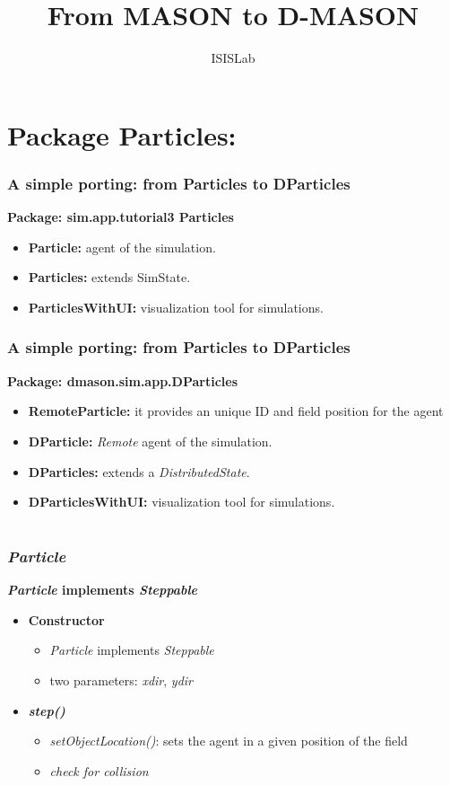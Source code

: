 \documentclass[]{beamer}
\title{From MASON to D-MASON}    %
\author{ISISLab}                 %
\institute{Università degli Studi di Salerno}      %
\date{}                    %
\begin{document}
\begin{frame}
  \titlepage{}
\end{frame}

\section[Package Particles vs D-Particles]{Package Particles:}
\begin{frame}
\frametitle{A simple porting: from Particles to DParticles}
\textbf{Package: sim.app.tutorial3 Particles}
\begin{itemize}
\item \textbf{Particle:} agent of the simulation.
\item \textbf{Particles:} extends SimState.
\item \textbf{ParticlesWithUI:} visualization tool for simulations.
\end{itemize}
\end{frame}

\begin{frame}
\frametitle{A simple porting: from Particles to DParticles}
\textbf{Package: dmason.sim.app.DParticles}
\begin{itemize}
\item \textbf{RemoteParticle:} it provides an unique ID and field position for the agent
\item \textbf{DParticle:} \textit{Remote} agent of the simulation.
\item \textbf{DParticles:} extends a \textit{DistributedState}.
\item \textbf{DParticlesWithUI:} visualization tool for simulations.
\end{itemize}
\end{frame}

\section[Particle]{}

\begin{frame}
\frametitle{\textit{Particle}}
\textbf{\textit{Particle} implements \textit{Steppable}}
\begin{itemize}
	\item \textbf{Constructor}
	\begin{itemize}
		\item \textit{Particle} implements \textit{Steppable}
		\item two parameters: \textit{xdir}, \textit{ydir}
	\end{itemize}
	\item\textbf{\textit{step()}}
	\begin{itemize}
		\item \textit{setObjectLocation()}: sets the agent in a given position of the field
		\item \textit{check for collision}
	\end{itemize}
\end{itemize}
\end{frame}
\end{document}
